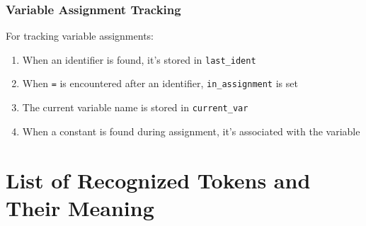 \documentclass[12pt]{article}
\begin{document}
\subsubsection{Variable Assignment Tracking}
For tracking variable assignments:
\begin{enumerate}
    \item When an identifier is found, it's stored in \texttt{last\_ident}
    \item When \texttt{=} is encountered after an identifier, \texttt{in\_assignment} is set
    \item The current variable name is stored in \texttt{current\_var}
    \item When a constant is found during assignment, it's associated with the variable
\end{enumerate}

\section{List of Recognized Tokens and Their Meaning}
\end{document}
